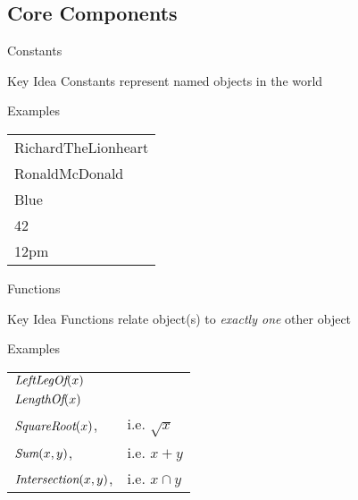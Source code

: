 \documentclass[12pt]{beamer}
\newcommand{\key}[1]{{\color{blue}#1}}
\newcommand{\EM}[1]{\mbox{\em#1}}
\newcommand{\limpl}{\Rightarrow}
\newcommand{\liff}{\Leftrightarrow}
\begin{document}
\subsection{Core Components}
\begin{frame}{Constants}
	\begin{block}{Key Idea}
		\alert{Constants} represent named objects in the world
	\end{block}
	\begin{block}{Examples}
		\em
		\begin{tabular}{l}
			RichardTheLionheart \\
			RonaldMcDonald \\
			Blue \\
			42 \\
			12pm \\
		\end{tabular}
	\end{block}
\end{frame}
\begin{frame}{Functions}
	\begin{block}{Key Idea}
		\alert{Functions} relate object(s) to \emph{exactly one} other object
	\end{block}
	\begin{block}{Examples}
		\begin{tabular}{ll}
			$\EM{LeftLegOf}(x)$ \\
			$\EM{LengthOf}(x)$ \\
			$\EM{SquareRoot}(x)$,      & i.e. $\sqrt{x}$ \\
			$\EM{Sum}(x, y)$,          & i.e. $x + y$ \\
			$\EM{Intersection}(x, y)$, & i.e. $x \cap y$ \\
		\end{tabular}
	\end{block}
\end{frame}
\end{document}

